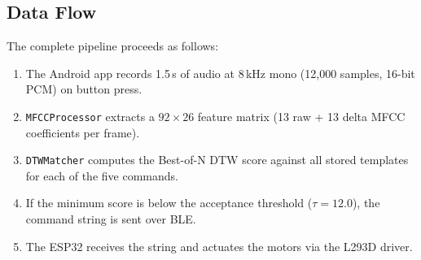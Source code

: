 \documentclass[conference]{IEEEtran}
\begin{document}


\subsection{Data Flow}
The complete pipeline proceeds as follows:
\begin{enumerate}
  \item The Android app records 1.5\,s of audio at 8\,kHz mono
    (12{,}000 samples, 16-bit PCM) on button press.
  \item \texttt{MFCCProcessor} extracts a $92 \times 26$ feature matrix
    (13 raw + 13 delta MFCC coefficients per frame).
  \item \texttt{DTWMatcher} computes the Best-of-N DTW score against all
    stored templates for each of the five commands.
  \item If the minimum score is below the acceptance threshold
    ($\tau = 12.0$), the command string is sent over BLE.
  \item The ESP32 receives the string and actuates the motors via the
    L293D driver.
\end{enumerate}
\end{document}
